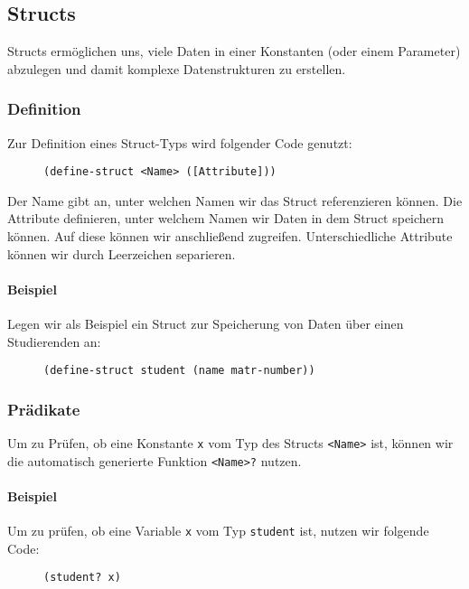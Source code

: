 \subsection{Structs}
	Structs ermöglichen uns, viele Daten in einer Konstanten (oder einem Parameter) abzulegen und damit komplexe Datenstrukturen zu erstellen.
	
	\subsubsection{Definition}
		Zur Definition eines Struct-Typs wird folgender Code genutzt:
		\begin{figure}[H]
			\centering
			\lstinline[language = Racket]|(define-struct <Name> ([Attribute]))|
		\end{figure}
		Der Name gibt an, unter welchen Namen wir das Struct referenzieren können. Die Attribute definieren, unter welchem Namen wir Daten in dem Struct speichern können. Auf diese können wir anschließend zugreifen. Unterschiedliche Attribute können wir durch Leerzeichen separieren.
		
		\paragraph{Beispiel}
			Legen wir als Beispiel ein Struct zur Speicherung von Daten über einen Studierenden an:
			\begin{figure}[H]
				\centering
				\begin{lstlisting}[language = Racket]
(define-struct student (name matr-number))
\end{lstlisting}
			\end{figure}
	
	\subsubsection{Prädikate}
		Um zu Prüfen, ob eine Konstante \texttt{x} vom Typ des Structs \texttt{<Name>} ist, können wir die automatisch generierte Funktion \texttt{<Name>?} nutzen.
		
		\paragraph{Beispiel}
			Um zu prüfen, ob eine Variable \texttt{x} vom Typ \texttt{student} ist, nutzen wir folgende Code:
			\begin{figure}[H]
				\centering
				\begin{lstlisting}[language = Racket]
(student? x)
\end{lstlisting}
			\end{figure}
	
